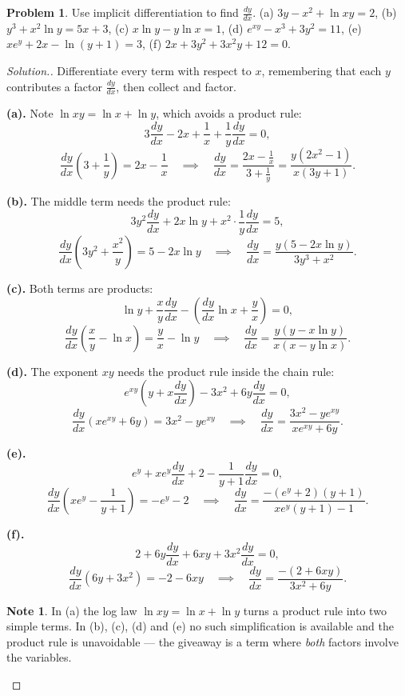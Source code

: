 \documentclass[11pt,a4paper]{article}
\theoremstyle{definition}
\newtheorem{note}[thm]{Note}
\newtheorem{problemx}{Problem}[section]
\newenvironment{problem}{\begin{problemx}}{\end{problemx}}
\newenvironment{solution}
  {\renewcommand{\qedsymbol}{}\begin{proof}[\textit{Solution}.]}
  {\end{proof}}
\begin{document}
\begin{problem}
Use implicit differentiation to find $\frac{dy}{dx}$.
\quad (a) $3y-x^2+\ln xy=2$, \quad (b) $y^3+x^2\ln y=5x+3$, \quad
(c) $x\ln y-y\ln x=1$, \quad (d) $e^{xy}-x^3+3y^2=11$, \quad
(e) $xe^y+2x-\ln(y+1)=3$, \quad (f) $2x+3y^2+3x^2y+12=0$.
\end{problem}

\begin{solution}
Differentiate every term with respect to $x$, remembering that each $y$ contributes a
factor $\frac{dy}{dx}$, then collect and factor.

\textbf{(a).} Note $\ln xy=\ln x+\ln y$, which avoids a product rule:
$$3\frac{dy}{dx}-2x+\frac{1}{x}+\frac{1}{y}\frac{dy}{dx}=0,$$
$$\frac{dy}{dx}\left(3+\frac{1}{y}\right)=2x-\frac{1}{x}\quad\implies\quad
\frac{dy}{dx}=\frac{2x-\frac{1}{x}}{3+\frac{1}{y}}
=\frac{y\left(2x^2-1\right)}{x(3y+1)}.$$

\textbf{(b).} The middle term needs the product rule:
$$3y^2\frac{dy}{dx}+2x\ln y+x^2\cdot\frac{1}{y}\frac{dy}{dx}=5,$$
$$\frac{dy}{dx}\left(3y^2+\frac{x^2}{y}\right)=5-2x\ln y\quad\implies\quad
\frac{dy}{dx}=\frac{y\left(5-2x\ln y\right)}{3y^3+x^2}.$$

\textbf{(c).} Both terms are products:
$$\ln y+\frac{x}{y}\frac{dy}{dx}-\left(\frac{dy}{dx}\ln x+\frac{y}{x}\right)=0,$$
$$\frac{dy}{dx}\left(\frac{x}{y}-\ln x\right)=\frac{y}{x}-\ln y
\quad\implies\quad \frac{dy}{dx}=\frac{y\left(y-x\ln y\right)}{x\left(x-y\ln x\right)}.$$

\textbf{(d).} The exponent $xy$ needs the product rule inside the chain rule:
$$e^{xy}\left(y+x\frac{dy}{dx}\right)-3x^2+6y\frac{dy}{dx}=0,$$
$$\frac{dy}{dx}\left(xe^{xy}+6y\right)=3x^2-ye^{xy}\quad\implies\quad
\frac{dy}{dx}=\frac{3x^2-ye^{xy}}{xe^{xy}+6y}.$$

\textbf{(e).}
$$e^y+xe^y\frac{dy}{dx}+2-\frac{1}{y+1}\frac{dy}{dx}=0,$$
$$\frac{dy}{dx}\left(xe^y-\frac{1}{y+1}\right)=-e^y-2\quad\implies\quad
\frac{dy}{dx}=\frac{-\left(e^y+2\right)(y+1)}{x e^y(y+1)-1}.$$

\textbf{(f).}
$$2+6y\frac{dy}{dx}+6xy+3x^2\frac{dy}{dx}=0,$$
$$\frac{dy}{dx}\left(6y+3x^2\right)=-2-6xy\quad\implies\quad
\frac{dy}{dx}=\frac{-(2+6xy)}{3x^2+6y}.$$

\begin{note}
In (a) the log law $\ln xy=\ln x+\ln y$ turns a product rule into two simple terms. In
(b), (c), (d) and (e) no such simplification is available and the product rule is
unavoidable --- the giveaway is a term where \emph{both} factors involve the variables.
\end{note}
\end{solution}
\end{document}
